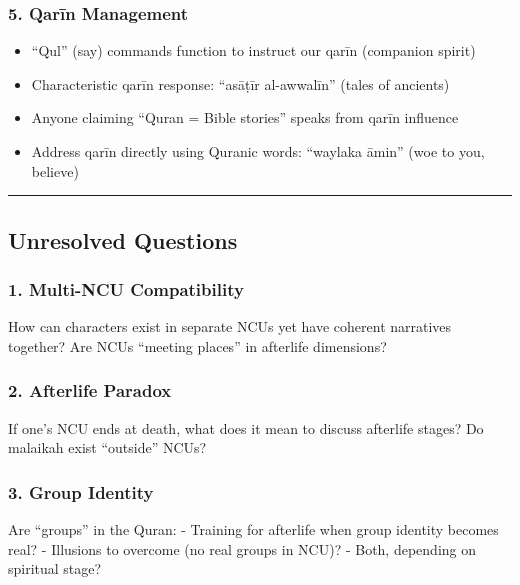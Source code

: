 \documentclass[12pt,a4paper]{article}
\providecommand{\tightlist}{\setlength{\itemsep}{0pt}\setlength{\parskip}{0pt}}
\begin{document}
\subsubsection{5. Qarīn Management}\label{qarux12bn-management}

\begin{itemize}
\tightlist
\item
  ``Qul'' (say) commands function to instruct our qarīn (companion
  spirit)
\item
  Characteristic qarīn response: ``asāṭīr al-awwalīn'' (tales of
  ancients)
\item
  Anyone claiming ``Quran = Bible stories'' speaks from qarīn influence
\item
  Address qarīn directly using Quranic words: ``waylaka āmin'' (woe to
  you, believe)
\end{itemize}

\begin{center}\rule{0.5\linewidth}{0.5pt}\end{center}

\subsection{Unresolved Questions}\label{unresolved-questions}

\subsubsection{1. Multi-NCU
Compatibility}\label{multi-ncu-compatibility}

How can characters exist in separate NCUs yet have coherent narratives
together? Are NCUs ``meeting places'' in afterlife dimensions?

\subsubsection{2. Afterlife Paradox}\label{afterlife-paradox}

If one's NCU ends at death, what does it mean to discuss afterlife
stages? Do malaikah exist ``outside'' NCUs?

\subsubsection{3. Group Identity}\label{group-identity}

Are ``groups'' in the Quran: - Training for afterlife when group
identity becomes real? - Illusions to overcome (no real groups in NCU)?
- Both, depending on spiritual stage?
\end{document}
